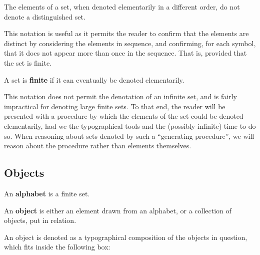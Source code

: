 \begin{notational-corollary}

The elements of a set, when denoted elementarily in a different order, do not
denote a distinguished set.

\end{notational-corollary}

This notation is useful as it permits the reader to confirm that the elements
are distinct by considering the elements in sequence, and confirming, for each
symbol, that it does not appear more than once in the sequence. That is,
provided that the set is finite.

\begin{notion}

A set is \textbf{finite} if it can eventually be denoted elementarily.

\end{notion}

This notation does not permit the denotation of an infinite set, and is fairly
impractical for denoting large finite sets. To that end, the reader will be
presented with a procedure by which the elements of the set could be denoted
elementarily, had we the typographical tools and the (possibly infinite) time
to do so. When reasoning about sets denoted by such a ``generating procedure'',
we will reason about the procedure rather than elements themselves.

\subsection{Objects}

\begin{definition}

An \textbf{alphabet} is a finite set.

\end{definition}

\begin{definition}

An \textbf{object} is either an element drawn from an alphabet, or a collection
of objects, put in relation.

\end{definition}

\begin{notation}

An object is denoted as a typographical composition of the objects in question,
which fits inside the following box:

\begin{center}
\end{center}

\end{notation}

